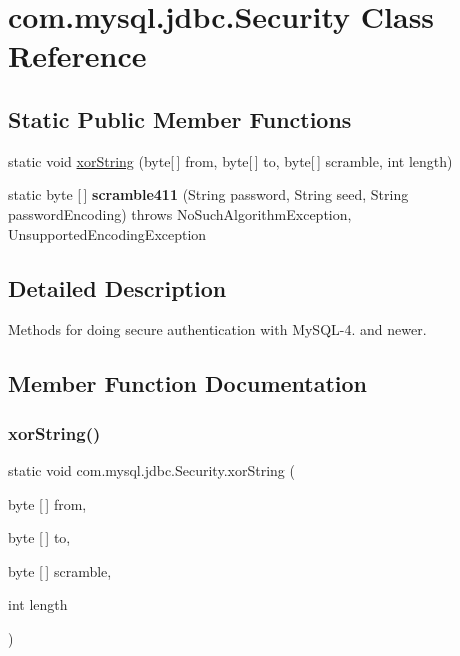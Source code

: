 \hypertarget{classcom_1_1mysql_1_1jdbc_1_1_security}{}\section{com.\+mysql.\+jdbc.\+Security Class Reference}
\label{classcom_1_1mysql_1_1jdbc_1_1_security}
\subsection*{Static Public Member Functions}
\begin{DoxyCompactItemize}
\item 
static void \mbox{\hyperlink{classcom_1_1mysql_1_1jdbc_1_1_security_addff67ad545fe6c84cfacf80dbacdf4f}{xor\+String}} (byte\mbox{[}$\,$\mbox{]} from, byte\mbox{[}$\,$\mbox{]} to, byte\mbox{[}$\,$\mbox{]} scramble, int length)
\item 
\mbox{\label{classcom_1_1mysql_1_1jdbc_1_1_security_aaef7d292418168c6a02db7610e3da156}} 
static byte \mbox{[}$\,$\mbox{]} {\bfseries scramble411} (String password, String seed, String password\+Encoding)  throws No\+Such\+Algorithm\+Exception, Unsupported\+Encoding\+Exception 
\end{DoxyCompactItemize}


\subsection{Detailed Description}
Methods for doing secure authentication with My\+S\+Q\+L-\/4. and newer. 

\subsection{Member Function Documentation}
\mbox{\label{classcom_1_1mysql_1_1jdbc_1_1_security_addff67ad545fe6c84cfacf80dbacdf4f}} 
\subsubsection{\texorpdfstring{xor\+String()}{xorString()}}
{\footnotesize\ttfamily static void com.\+mysql.\+jdbc.\+Security.\+xor\+String (\begin{DoxyParamCaption}\item[{byte \mbox{[}$\,$\mbox{]}}]{from,  }\item[{byte \mbox{[}$\,$\mbox{]}}]{to,  }\item[{byte \mbox{[}$\,$\mbox{]}}]{scramble,  }\item[{int}]{length }\end{DoxyParamCaption})\hspace{0.3cm}{\ttfamily [static]}}

